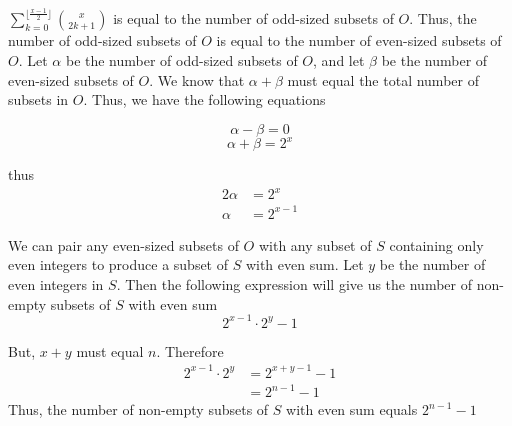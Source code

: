 \documentclass{article}
\begin{document}
\vspace{5mm}


$\sum_{k=0}^{\lfloor \frac{x-1}{2} \rfloor} \binom{x}{2k+1}$ is equal to the number of odd-sized subsets of $O$. Thus, the number of odd-sized subsets of $O$ is equal to the number of even-sized subsets of $O$. Let $\alpha$ be the number of odd-sized subsets of $O$, and let $\beta$ be the number of even-sized subsets of $O$. We know that $\alpha + \beta$ must equal the total number of subsets in $O$. Thus, we have the following equations

  \begin{equation}
  \alpha - \beta = 0
\end{equation} 
\begin{equation}
  \alpha + \beta = 2^{x}
\end{equation} 

\vspace{5mm}
thus
\begin{align*}
   2\alpha &= 2^{x}\\
   \alpha &= 2^{x-1}
  \end{align*}  

\vspace{5mm}
We can pair any even-sized subsets of $O$ with any subset of $S$ containing only even integers to produce a subset of $S$ with even sum. Let $y$ be the number of even integers in $S$. Then the following expression will give us the number of non-empty subsets of $S$ with even sum
  \begin{equation}
  2^{x-1}\cdot2^{y} - 1
\end{equation} 

But, $x + y$ must equal $n$. Therefore
\begin{align*}
2^{x-1}\cdot2^{y}&= 2^{x+y-1} - 1\\
&= 2^{n-1} - 1
  \end{align*}  
\vspace{5mm}
Thus, the number of non-empty subsets of $S$ with even sum equals $2^{n-1} -1$
  
\end{document}
